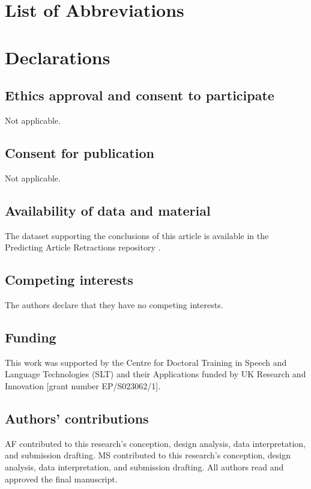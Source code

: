 \documentclass[pdflatex,sn-mathphys-num]{sn-jnl}%
\begin{document}
\section{List of Abbreviations}

\printglossary[type=\acronymtype]

\section*{Declarations}
\subsection*{Ethics approval and consent to participate}

Not applicable.

\subsection*{Consent for publication}

Not applicable.

\subsection*{Availability of data and material}
\label{sec:Data Availability}
The dataset supporting the conclusions of this article is available in the Predicting Article Retractions repository \cite{noauthor_anonymized_nodate}.

\subsection*{Competing interests}
The authors declare that they have no competing interests.


\subsection*{Funding}
\label{sec:Funding}
This work was supported by the Centre for Doctoral Training in Speech and Language Technologies (SLT) and their Applications funded by UK Research and Innovation [grant number EP/S023062/1].


\subsection*{Authors' contributions }

AF contributed to this research's conception, design analysis, data interpretation, and submission drafting. MS contributed to this research's conception, design analysis, data interpretation, and submission drafting. All authors read and approved the final manuscript.
\end{document}
